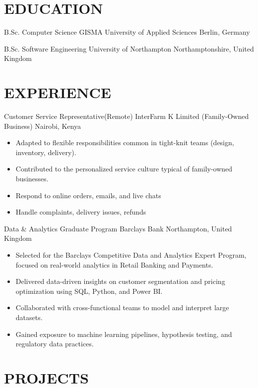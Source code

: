\documentclass[11pt,a4paper,sans]{moderncv}
\begin{document}
	
	\makecvtitle
	
	\section{EDUCATION}
	{B.Sc. Computer Science}
	{GISMA University of Applied Sciences}
	{}
	{}
	{Berlin, Germany}
	
	{B.Sc. Software Engineering}
	{University of Northampton}
	{}
	{}
	{Northamptonshire, United Kingdom}
	
	\section{EXPERIENCE}
	
	{Customer Service Representative(Remote)} 
	{InterFarm K Limited (Family-Owned Business)}
	{Nairobi, Kenya}
	{}
	{
		\begin{itemize}
			\item Adapted to flexible responsibilities common in tight-knit teams (design, inventory, delivery).
			\item Contributed to the personalized service culture typical of family-owned businesses.
			\item Respond to online orders, emails, and live chats
			\item Handle complaints, delivery issues, refunds
		\end{itemize}
	}
	
	{Data \& Analytics Graduate Program}
	{Barclays Bank}
	{Northampton, United Kingdom}
	{}
	{
		\begin{itemize}
			\item Selected for the Barclays Competitive Data and Analytics Expert Program, 
			focused on real-world analytics in Retail Banking and Payments.
			\item Delivered data-driven insights on customer segmentation and 
			pricing optimization using SQL, Python, and Power BI.
			\item Collaborated with cross-functional teams to model and interpret large datasets.
			\item Gained exposure to machine learning pipelines, hypothesis testing, and regulatory data practices.
		\end{itemize}	
	}
	
	\section{PROJECTS}
	
\end{document}
